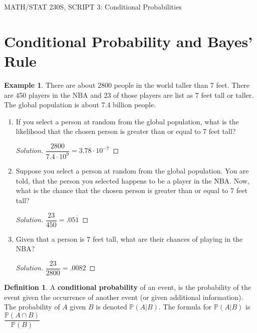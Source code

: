 \documentclass[12pt]{article}
\newcommand{\bbP}{\mathbb{P}}
\renewcommand{\_}[1]{\underline{ #1 }}
\theoremstyle{definition}
\newtheorem{definition}[theorem]{Definition}
\newtheorem{example}[theorem]{Example}
\numberwithin{equation}{subsection}
\begin{document}
\begin{center}
{\large MATH/STAT 230S, SCRIPT 3: Conditional Probabilities} \\ 
\vspace{.2in}  

\end{center}

\setcounter{section}{2}

\section{Conditional Probability and Bayes' Rule}
\begin{example}
 	There are about 2800 people in the world taller than 7 feet. There are 450 players in the NBA and 23 of those players are list as 7 feet tall or taller. The global population is about 7.4 billion people.
	\begin{enumerate}
		\item If you select a person at random from the global population, what is the likelihood that the chosen person is greater than or equal to 7 feet tall?
		\begin{proof}[Solution]
		$\dfrac{2800}{7.4\cdot 10^9}=3.78\cdot 10^{-7}$
		\end{proof}
		\item Suppose you select a person at random from the global population. You are told, that the person you selected happens to be a player in the NBA. Now, what is the chance that the chosen person is greater than or equal to 7 feet tall?
		\begin{proof}[Solution]
		$\dfrac{23}{450}=.05\overline{1}$
		\end{proof}
		\item Given that a person is 7 feet tall, what are their chances of playing in the NBA?
		\begin{proof}[Solution]
		$\dfrac{23}{2800}=.0082$
		\end{proof}
	\end{enumerate}
\end{example}

\begin{definition}
A \textbf{conditional probability} of an event, is the probability of the event given the occurrence of another event (or given additional information). The probability of $A$ given $B$ is denoted $\mathbb{P}(A|B)$. The formula for $\bbP(A|B)$ is $\dfrac{\bbP(A\cap B)}{\bbP(B)}$
\end{definition}
\end{document}

